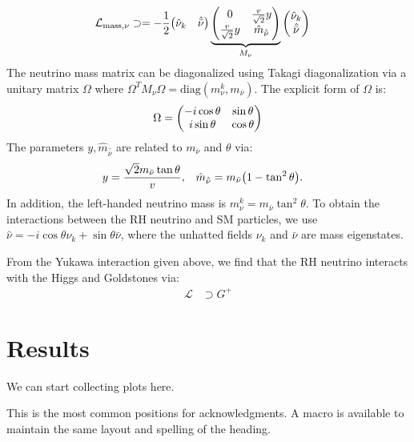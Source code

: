 \documentclass[a4paper,11pt]{article} \pdfoutput=1
\begin{document}
\begin{align}
	\mathcal{L}_{\mathrm{mass},\nu}
	                    & \supset
	=
	-\frac{1}{2}
	\mqty(\hat{\nu}_{k} & \hat{\bar{\nu}})
	\underbrace{\mqty(0 & \frac{v}{\sqrt{2}}y \\ \frac{v}{\sqrt{2}}y & \hat{m}_{\hat{\bar{\nu}}})}_{M_{\nu}}
	\mqty(\hat{\nu}_{k}                       \\ \hat{\bar{\nu}})
\end{align}
The neutrino mass matrix can be diagonalized using Takagi diagonalization via a
unitary matrix \(\Omega\) where
\(\Omega^{T}M_{\nu}\Omega = \mathrm{diag}(m^{k}_{\nu}, m_{\bar{\nu}})\). The
explicit form of \(\Omega\) is:
\begin{align}
	\Omega = \mqty(-i\cos\theta & \sin\theta \\ i\sin\theta & \cos\theta)
\end{align}
The parameters \(y, \hat{m}_{\hat{\bar{\nu}}}\) are related to \(m_{\bar{\nu}}\)
and \(\theta\) via:
\begin{align}
	y & = \frac{\sqrt{2}m_{\bar{\nu}}\tan\theta}{v}, & \hat{m}_{\hat{\bar{\nu}}} & = m_{\bar{\nu}}\qty(1-\tan^2\theta).
\end{align}
In addition, the left-handed neutrino mass is \(m^{k}_{\nu} = m_{\bar{\nu}}\tan^2\theta\).
To obtain the interactions between the RH neutrino and SM particles, we use
\(\hat{\nu} = -i\cos\theta\nu_{k} + \sin\theta\bar{\nu}\), where the unhatted
fields \(\nu_{k}\) and \(\bar{\nu}\) are mass eigenstates.

From the Yukawa interaction given above, we find that the RH neutrino interacts
with the Higgs and Goldstones via:
\begin{align}
	\mathcal{L} & \supset G^{+}
\end{align}

\section{Results}
\label{sec:results}
We can start collecting plots here.







\acknowledgments

This is the most common positions for acknowledgments. A macro is
available to maintain the same layout and spelling of the heading.

\end{document}

